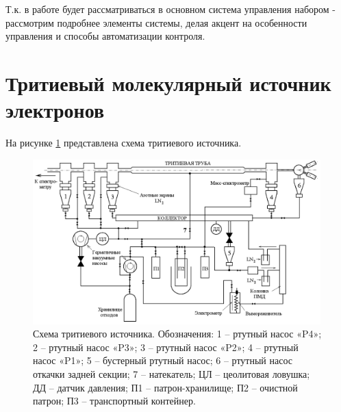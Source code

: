 \documentclass[a4paper,14pt]{extreport}
\begin{document}
Т.к. в работе будет рассматриваться в основном система управления набором - рассмотрим подробнее элементы системы, делая акцент на особенности управления и способы автоматизации контроля.
\section{Тритиевый молекулярный источник электронов}

На рисунке \ref{fig:numass-source} представлена схема тритиевого источника.

\begin{figure}
  \centering
  \includegraphics[width = 0.99\textwidth]{img/nu_mass_setup/source-control.png}
    \caption{Схема тритиевого источника. Обозначения: 1 – ртутный насос «P4»; 2 – ртутный насос «P3»; 3 – ртутный насос «P2»; 4 – ртутный насос «P1»; 5 – бустерный ртутный насос; 6 – ртутный насос откачки задней секции; 7 – натекатель; ЦЛ – цеолитовая ловушка; ДД – датчик давления; П1 – патрон-хранилище; П2 – очистной патрон; П3 – транспортный контейнер.}
    \label{fig:numass-source}
\end{figure}
\end{document}
